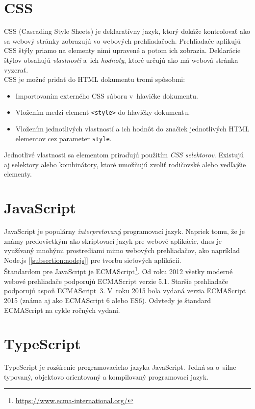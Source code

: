 \section{CSS}
CSS (Cascading Style Sheets) je deklaratívny jazyk, ktorý dokáže kontrolovať ako sa webový stránky zobrazujú vo webových prehliadačoch. Prehliadače aplikujú CSS štýly priamo na elementy nimi upravené a potom ich zobrazia. Deklarácie štýlov obsahujú \emph{vlastnosti} a~ich \emph{hodnoty}, ktoré určujú ako má webová stránka vyzerať. \cite{MDN} \\

\noindent CSS je možné pridať do HTML dokumentu tromi spôsobmi: 
\begin{itemize}
	\item Importovaním externého CSS súboru v~hlavičke dokumentu.
	\item Vložením medzi element \texttt{<style>} do hlavičky dokumentu.
	\item Vložením jednotlivých vlastností a ich hodnôt do značiek jednotlivých HTML elementov cez parameter \texttt{style}.
\end{itemize}

\noindent Jednotlivé vlastnosti sa elementom priraďujú použitím \emph{CSS selektorov}. Existujú aj selektory alebo kombinátory, ktoré umožňujú zvoliť rodičovské alebo vedľajšie elementy. \cite{MDN} \\

\section{JavaScript}
JavaScript je populárny \emph{interpretovaný} programovací jazyk. Napriek tomu, že je známy predovšetkým ako skriptovací jazyk pre webové aplikácie, dnes je využívaný mnohými prostrediami mimo webových prehliadačov, ako napríklad Node.js [\ref{subsection:nodejs}] pre tvorbu sieťových aplikácií. \cite{MDN} \\

\noindent Štandardom pre JavaScript je ECMAScript\footnote{\href{https://www.ecma-international.org/}{https://www.ecma-international.org/}}. Od roku 2012 všetky moderné webové prehliadače podporujú ECMAScript verzie 5.1. Staršie prehliadače podporujú aspoň ECMAScript~3. V~roku 2015 bola vydaná verzia ECMAScript 2015 (známa aj ako ECMAScript 6 alebo ES6). Odvtedy je štandard ECMAScript na cykle ročných vydaní. \cite{MDN}

\section{TypeScript}
\label{theory:typescript}
TypeScript je rozšírenie programovacieho jazyka JavaScript. Jedná sa o~silne typovaný, objektovo orientovaný a kompilovaný programovací jazyk. \cite{TSWeb}

